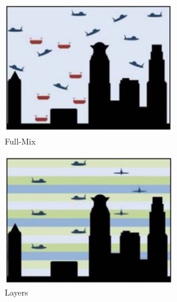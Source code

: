 \begin{figure}[!ht]
    \centering
    \begin{subfigure}{.23\textwidth}
        \includegraphics[width=\textwidth]{img/full-mix.jpg}
        \caption{Full-Mix}
        \label{full-mix}
    \end{subfigure}
    \begin{subfigure}{.23\textwidth}
        \includegraphics[width=\textwidth]{img/layers.jpg}
        \caption{Layers}
        \label{layers}
    \end{subfigure}
    \begin{subfigure}{.23\textwidth}

\end{subfigure}
\end{figure}
